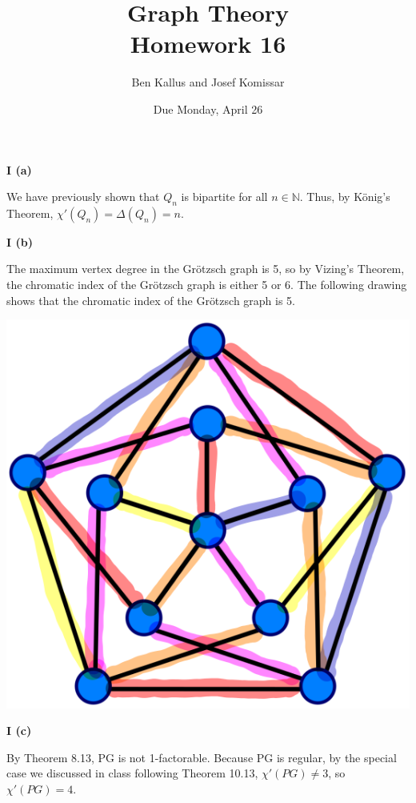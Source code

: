 \documentclass[12pt]{article}
\title{Graph Theory \\ Homework 16}
\author{Ben Kallus and Josef Komissar}
\date{Due Monday, April 26}
\begin{document}
\maketitle

\medskip\noindent\textbf{I (a)}

    We have previously shown that $Q_n$ is bipartite for all $n \in \mathbb N$.
    Thus, by K\"onig's Theorem, $\chi'(Q_n) = \Delta(Q_n) = n$.

\medskip\noindent\textbf{I (b)}

    The maximum vertex degree in the Gr\"otzsch graph is 5, so by Vizing's Theorem, the chromatic index of the Gr\"otzsch graph is either 5 or 6.
    The following drawing shows that the chromatic index of the Gr\"otzsch graph is 5.
    \begin{center} \includegraphics[scale=.5]{fig1.png} \end{center}

\medskip\noindent\textbf{I (c)}

    By Theorem 8.13, PG is not 1-factorable.
    Because PG is regular, by the special case we discussed in class following Theorem 10.13, $\chi'(PG) \neq 3$, so $\chi'(PG) = 4$.
\end{document}
